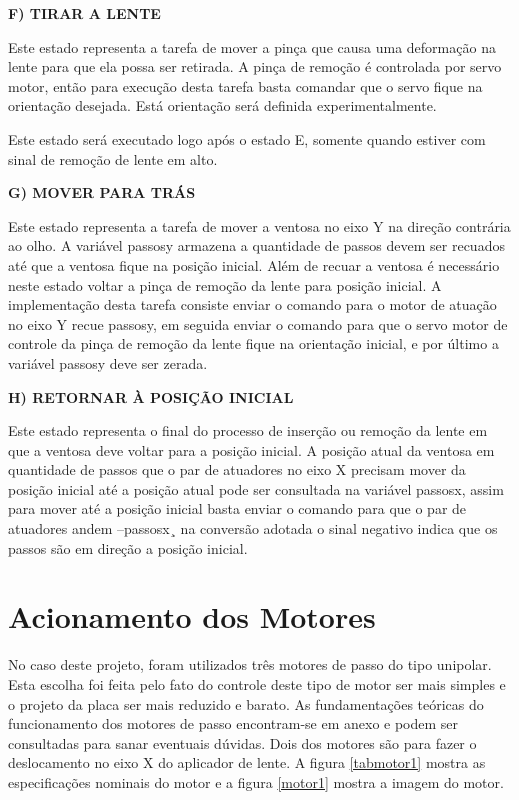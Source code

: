 \textbf{F)	TIRAR A LENTE}

Este estado representa a tarefa de mover a pinça que causa uma deformação na lente para que ela possa ser retirada. A pinça de remoção é controlada por servo motor, então para execução desta tarefa basta comandar que o servo fique na orientação desejada. Está orientação será definida experimentalmente.

Este estado será executado logo após o estado E, somente quando estiver com sinal de remoção de lente em alto. 


\textbf{G)	MOVER PARA TRÁS}

Este estado representa a tarefa de mover a ventosa no eixo Y na direção contrária ao olho. A variável passosy armazena a quantidade de passos devem ser recuados até que a ventosa fique na posição inicial. Além de recuar a ventosa é necessário neste estado voltar a pinça de remoção da lente para posição inicial. A implementação desta tarefa consiste enviar o comando para o motor de atuação no eixo Y recue passosy, em seguida enviar o comando para que o servo motor de controle da pinça de remoção da lente fique na orientação inicial, e por último a variável passosy deve ser zerada. 

 
\textbf{H) RETORNAR À POSIÇÃO INICIAL}

Este estado representa o final do processo de inserção ou remoção da lente em que a ventosa deve voltar para a posição inicial. A posição atual da ventosa em quantidade de passos que o par de atuadores no eixo X precisam mover da posição inicial até a posição atual pode ser consultada na variável passosx, assim para mover até a posição inicial basta enviar o comando para que o par de atuadores andem –passosx¸ na conversão adotada o sinal negativo indica que os passos são em direção a posição inicial. 


\section[Acionamento dos Motores]{Acionamento dos Motores}
	
No caso deste projeto, foram utilizados três motores de passo do tipo unipolar. Esta escolha foi feita pelo fato do controle deste tipo de motor ser mais simples e o projeto da placa ser mais reduzido e barato. As fundamentações teóricas do funcionamento dos motores de passo encontram-se em anexo e podem ser consultadas para sanar eventuais dúvidas. Dois dos motores são para fazer o deslocamento no eixo X do aplicador de lente. A figura \ref{tabmotor1} mostra as especificações nominais do motor e a figura \ref{motor1} mostra a imagem do motor.

